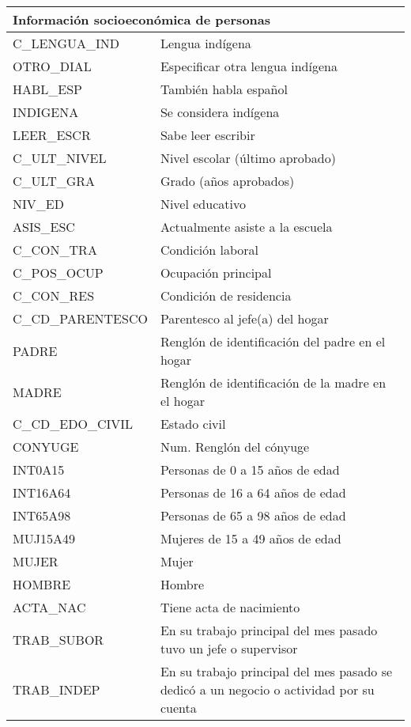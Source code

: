 \begin{longtable}{|p{8cm}|p{8cm}|}
    \multicolumn{2}{l}{Información socioeconómica de personas}\\
    \hline
    C\_LENGUA\_IND & Lengua indígena \\
    \hline
    OTRO\_DIAL & Especificar otra lengua indígena\\
    \hline
    HABL\_ESP & También habla español \\
    \hline
    INDIGENA & Se considera indígena \\
    \hline
    LEER\_ESCR & Sabe leer escribir \\
    \hline
    C\_ULT\_NIVEL & Nivel escolar (último aprobado) \\
    \hline
    C\_ULT\_GRA & Grado (años aprobados) \\
    \hline
    NIV\_ED & Nivel educativo \\
    \hline
    ASIS\_ESC & Actualmente asiste a la escuela \\
    \hline
    C\_CON\_TRA & Condición laboral \\
    \hline
    C\_POS\_OCUP & Ocupación principal \\
    \hline
    C\_CON\_RES & Condición de residencia \\
    \hline
    C\_CD\_PARENTESCO & Parentesco al jefe(a) del hogar \\
    \hline
    PADRE & Renglón de identificación del padre en el hogar \\
    \hline
    MADRE & Renglón de identificación de la madre en el hogar \\
    \hline
    C\_CD\_EDO\_CIVIL & Estado civil \\
    \hline
    CONYUGE & Num. Renglón del cónyuge \\
    \hline
    INT0A15 & Personas de 0 a 15 años de edad \\
    \hline
    INT16A64 & Personas de 16 a 64 años de edad \\
    \hline
    INT65A98 & Personas de 65 a 98 años de edad \\
    \hline
    MUJ15A49 & Mujeres de 15 a 49 años de edad \\
    \hline
    MUJER & Mujer \\
    \hline
    HOMBRE & Hombre \\
    \hline
    ACTA\_NAC & Tiene acta de nacimiento \\
    \hline
    TRAB\_SUBOR & En su trabajo principal del mes pasado tuvo un jefe o supervisor \\
    \hline
    TRAB\_INDEP & En su trabajo principal del mes pasado se dedicó a un negocio o actividad por su cuenta \\

\end{longtable}

